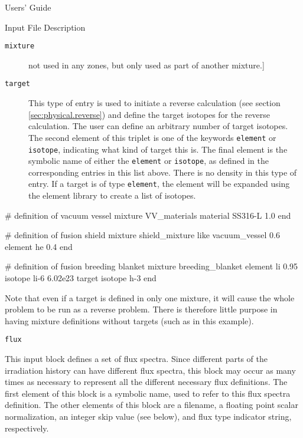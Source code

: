 \begin{chapter}{Users' Guide\label{app:user.guide}}
\begin{section}{Input File Description\label{app:user.input}}
\begin{subsection}{\texttt{mixture}\label{app:user.input.mix}}
\begin{description}
        not used in any zones, but only used as part of another
        mixture.]
      \item[\texttt{target}] This type of entry is used to initiate a
        reverse calculation (see section \ref{sec:physical.reverse})
        and define the target isotopes for the reverse calculation.
        The user can define an arbitrary number of target isotopes.
        The second element of this triplet is one of the keywords
        \texttt{element} or \texttt{isotope}, indicating what kind of
        target this is.  The final element is the symbolic name of
        either the \texttt{element} or \texttt{isotope}, as defined in
        the corresponding entries in this list above.  There is no
        density in this type of entry.  If a target is of type
        \texttt{element}, the element will be expanded using the
        element library to create a list of isotopes.
      \end{description}
 
      \begin{center}
        \renewcommand{\baselinestretch}{1}\normalsize
        \begin{boxedverbatim}
# definition of vacuum vessel
mixture VV_materials
   material SS316-L 1.0
end

# definition of fusion shield
mixture shield_mixture
   like     vacuum_vessel  0.6
   element  he             0.4
end

# definition of fusion breeding blanket
mixture breeding_blanket
   element  li      0.95
   isotope  li-6    6.02e23
   target   isotope h-3
end
\end{boxedverbatim}
      \end{center}

      Note that even if a target is defined in only one mixture, it
      will cause the whole problem to be run as a reverse problem.
      There is therefore little purpose in having mixture definitions
      without targets (such as in this example).
    \end{subsection}

    \begin{subsection}{\texttt{flux}\label{app:user.input.flux}}
      
      This input block defines a set of flux spectra.  Since different
      parts of the irradiation history can have different flux
      spectra, this block may occur as many times as necessary to
      represent all the different necessary flux definitions.  The
      first element of this block is a symbolic name, used to refer to
      this flux spectra definition.  The other elements of this block
      are a filename, a floating point scalar normalization, an
      integer skip value (see below), and flux type indicator string,
      respectively.


\end{subsection}
\end{section}
\end{chapter}
